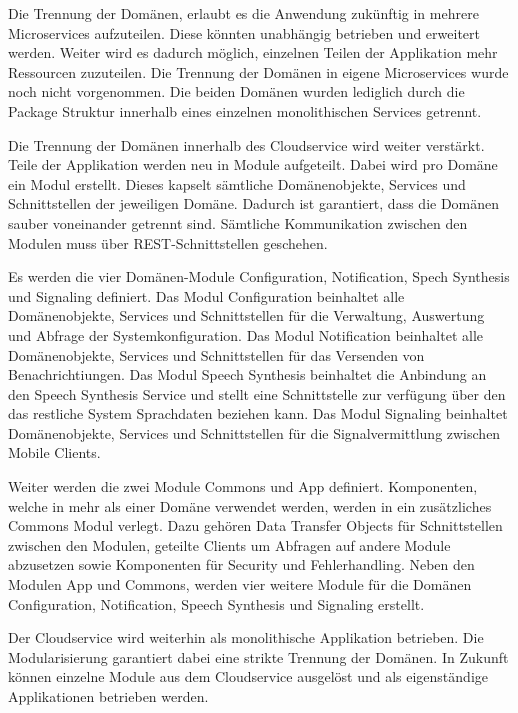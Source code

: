 Die Trennung der Domänen, erlaubt es die Anwendung zukünftig in mehrere Microservices aufzuteilen.
Diese könnten unabhängig betrieben und erweitert werden.
Weiter wird es dadurch möglich, einzelnen Teilen der Applikation mehr Ressourcen zuzuteilen.
Die Trennung der Domänen in eigene Microservices wurde noch nicht vorgenommen.
Die beiden Domänen wurden lediglich durch die Package Struktur innerhalb eines einzelnen monolithischen Services getrennt.

Die Trennung der Domänen innerhalb des Cloudservice wird weiter verstärkt.
Teile der Applikation werden neu in Module aufgeteilt.
Dabei wird pro Domäne ein Modul erstellt.
Dieses kapselt sämtliche Domänenobjekte, Services und Schnittstellen der jeweiligen Domäne.
Dadurch ist garantiert, dass die Domänen sauber voneinander getrennt sind.
Sämtliche Kommunikation zwischen den Modulen muss über REST-Schnittstellen geschehen.

Es werden die vier Domänen-Module Configuration, Notification, Spech Synthesis und Signaling definiert.
Das Modul Configuration beinhaltet alle Domänenobjekte, Services und Schnittstellen für die Verwaltung, Auswertung und Abfrage der Systemkonfiguration.
Das Modul Notification beinhaltet alle Domänenobjekte, Services und Schnittstellen für das Versenden von Benachrichtiungen.
Das Modul Speech Synthesis beinhaltet die Anbindung an den Speech Synthesis Service und stellt eine Schnittstelle zur verfügung über den das restliche System Sprachdaten beziehen kann.
Das Modul Signaling beinhaltet Domänenobjekte, Services und Schnittstellen für die Signalvermittlung zwischen Mobile Clients.

Weiter werden die zwei Module Commons und App definiert.
Komponenten, welche in mehr als einer Domäne verwendet werden, werden in ein zusätzliches Commons Modul verlegt.
Dazu gehören Data Transfer Objects für Schnittstellen zwischen den Modulen, geteilte Clients um Abfragen auf andere Module abzusetzen sowie Komponenten für Security und Fehlerhandling.
Neben den Modulen App und Commons, werden vier weitere Module für die Domänen Configuration, Notification, Speech Synthesis und Signaling erstellt.

Der Cloudservice wird weiterhin als monolithische Applikation betrieben.
Die Modularisierung garantiert dabei eine strikte Trennung der Domänen.
In Zukunft können einzelne Module aus dem Cloudservice ausgelöst und als eigenständige Applikationen betrieben werden.

\clearpage
